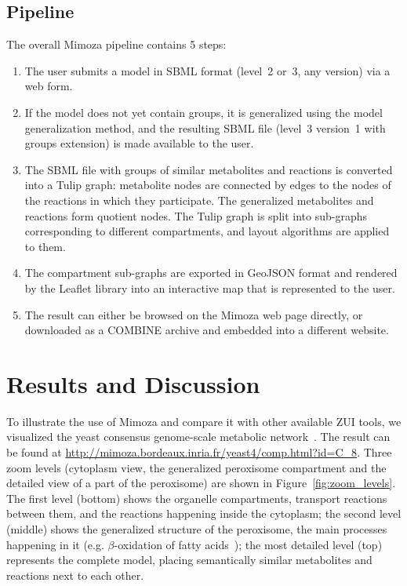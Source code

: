 \documentclass{bmcart}
\begin{document}
 
\subsection*{Pipeline}
The overall Mimoza pipeline contains 5 steps:
\begin{enumerate}
\item The user submits a model in SBML format (level~2 or~3, any version) via a web form.
\item If the model does not yet contain groups, it is generalized using the model generalization method, and the resulting SBML file (level~3 version~1 with groups extension) is made available to the user.
\item The SBML file with groups of similar metabolites and reactions is converted into a Tulip graph: metabolite nodes are connected by edges to the nodes of the reactions in which they participate. The generalized metabolites and reactions form quotient nodes. The Tulip graph is split into sub-graphs corresponding to different compartments, and layout algorithms are applied to them.
\item The compartment sub-graphs are exported in GeoJSON format and rendered by the Leaflet library into an interactive map that is represented to the user.
\item The result can either be browsed on the Mimoza web page directly, or downloaded as a COMBINE archive and embedded into a different website.
\end{enumerate}


\section*{Results and Discussion}
To illustrate the use of Mimoza and compare it with other available ZUI tools, we visualized the yeast consensus genome-scale metabolic network~\cite{Herrgard2008}. The result can be found at \url{http://mimoza.bordeaux.inria.fr/yeast4/comp.html?id=C_8}. 
Three zoom levels (cytoplasm view, the generalized peroxisome compartment and the detailed view of a part of the peroxisome) are shown in Figure~\ref{fig:zoom_levels}. The first level (bottom) shows the organelle compartments, transport reactions between them, and the reactions happening inside the cytoplasm; the second level (middle) shows the generalized structure of the peroxisome, the main processes happening in it (e.g. $\beta$-oxidation of fatty acids~\cite{Metzler01}); the most detailed level (top) represents the complete model, placing semantically similar metabolites and reactions next to each other.
\end{document}
